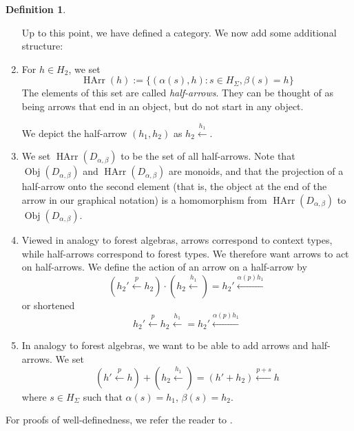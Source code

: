 \documentclass[sigplan,9pt]{acmart}\settopmatter{printfolios=true,printccs=false,printacmref=false}
\newcounter{thm}
\newcounter{theorem}
\theoremstyle{definition}
\newtheorem{defin}[thm]{Definition}
\newcommand{\carrow}[3]{#3 \xleftarrow{#2} #1 }
\newcommand{\HArr}[0]{{\operatorname{HArr}}}
\newcommand{\Obj}[0]{{\operatorname{Obj}}}
\begin{document}
\begin{defin}
\begin{enumerate}
Up to this point, we have defined a category. We now add some additional structure:

\item For $h \in H_2$, we set
$$\HArr(h) := \{(\alpha(s), h) : s \in H_\Sigma, \beta(s) = h\}$$
The elements of this set are called \emph{half-arrows}. They can be thought of as being arrows that end in an object, but do not start in any object.

We depict the half-arrow $(h_1, h_2)$ as $\carrow{}{h_1}{h_2}$.

\item We set $\HArr(D_{\alpha,\beta})$ to be the set of all half-arrows. Note that $\Obj(D_{\alpha,\beta})$ and $\HArr(D_{\alpha,\beta})$ are monoids, and that the projection of a half-arrow onto the second element (that is, the object at the end of the arrow in our graphical notation) is a homomorphism from $\HArr(D_{\alpha,\beta})$ to $\Obj(D_{\alpha,\beta})$.%


\item Viewed in analogy to forest algebras, arrows correspond to context types, while half-arrows correspond to forest types. We therefore want arrows to act on half-arrows. We define the action of an arrow on a half-arrow by
$$\left(\carrow{h_2}{p}{h_2'}\right)\cdot\left(\carrow{}{h_1}{h_2}\right)=\carrow{}{\alpha(p)h_1}{h_2'}$$
or shortened
$$\carrow{\carrow{}{h_1}{h_2}}{p}{h_2'}=\carrow{}{\alpha(p)h_1}{h_2'}$$
\item In analogy to forest algebras, we want to be able to add arrows and half-arrows. We set
$$\left(\carrow{h}{p}{h'}\right)+\left(\carrow{}{h_1}{h_2}\right) = \carrow{h}{p+s}{\left(h'+h_2\right)}$$
where $s\in H_\Sigma$ such that $\alpha(s) = h_1$, $\beta(s)=h_2$.
\end{enumerate}
For proofs of well-definedness, we refer the reader to  \cite{straubing-forest-2018}.
\end{defin}

\end{document}
